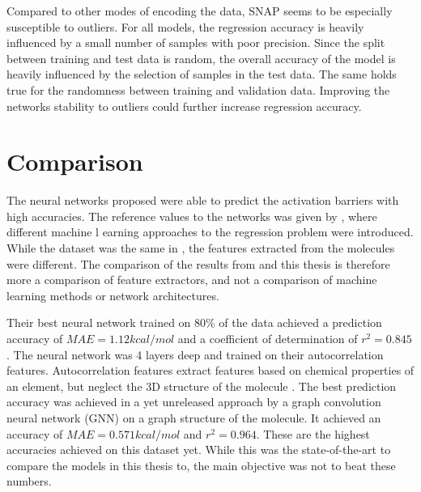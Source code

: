 Compared to other modes of encoding the data, SNAP seems to be especially susceptible to outliers.
For all models, the regression accuracy is heavily influenced by a small number of samples with poor precision.
Since the split between training and test data is random, the overall accuracy of the model is 
heavily influenced by the selection of samples in the test data.
The same holds true for the randomness between training and validation data.
Improving the networks stability to outliers could further increase regression accuracy.


\section{Comparison}
\label{sec:Evaluation:Comparison}

The neural networks proposed were able to predict the activation barriers with high accuracies.
The reference values to the networks was given by \cite{friederich_dos}, where different machine l earning 
approaches to the regression problem were introduced.
While the dataset was the same in \cite{friederich_dos}, the features extracted from the molecules were different.
The comparison of the results from  and this thesis is therefore more 
a comparison of feature extractors, and not a comparison of machine learning methods or network architectures.

Their best neural network trained on 80\% of the data achieved a prediction accuracy of $MAE = 1.12 kcal/mol$ and a 
coefficient of determination of $r^2 = 0.845$.
The neural network was 4 layers deep and trained on their autocorrelation features.
Autocorrelation features extract features based on chemical properties of an element, but neglect the 
3D structure of the molecule \cite{friederich_dos}.
The best prediction accuracy was achieved in a yet unreleased approach by a graph convolution neural network (GNN) on 
a graph structure of the molecule.
It achieved an accuracy of $MAE = 0.571 kcal/mol$ and $r^2=0.964$.
These are the highest accuracies achieved on this dataset yet.
While this was the state-of-the-art to compare the models in this thesis to, the main objective was not to beat these numbers.

